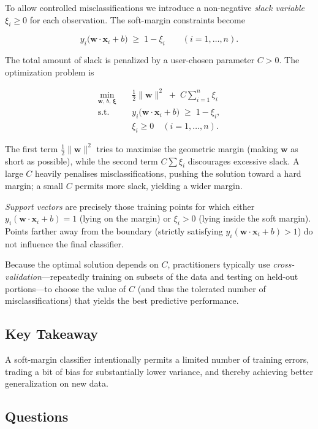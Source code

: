 \documentclass[12pt, a4paper]{article}
\begin{document}
To allow controlled misclassifications we introduce a non-negative \emph{slack variable} \(\xi_i\ge 0\) for each observation.  The soft-margin constraints become  

\[
y_i\bigl(\mathbf{w}\!\cdot\!\mathbf{x}_i + b\bigr) \;\ge\; 1 - \xi_i \qquad (i=1,\dots,n).
\]

The total amount of slack is penalized by a user-chosen parameter \(C>0\).  The optimization problem is  

\[
\begin{aligned}
\min_{\mathbf{w},\,b,\,\boldsymbol{\xi}} \quad & \frac{1}{2}\|\mathbf{w}\|^{2} \;+\; C\sum_{i=1}^{n}\xi_i \\[4pt]
\text{s.t.}\quad & y_i\bigl(\mathbf{w}\!\cdot\!\mathbf{x}_i + b\bigr) \;\ge\; 1 - \xi_i,\\
                 & \xi_i \ge 0 \quad (i=1,\dots,n).
\end{aligned}
\]

The first term \(\tfrac{1}{2}\|\mathbf{w}\|^{2}\) tries to maximise the geometric margin (making \(\mathbf{w}\) as short as possible), while the second term \(C\sum\xi_i\) discourages excessive slack.  A large \(C\) heavily penalises misclassifications, pushing the solution toward a hard margin; a small \(C\) permits more slack, yielding a wider margin.  

\emph{Support vectors} are precisely those training points for which either \(y_i(\mathbf{w}\!\cdot\!\mathbf{x}_i + b)=1\) (lying on the margin) or \(\xi_i>0\) (lying inside the soft margin).  Points farther away from the boundary (strictly satisfying \(y_i(\mathbf{w}\!\cdot\!\mathbf{x}_i + b) > 1\)) do not influence the final classifier.

Because the optimal solution depends on \(C\), practitioners typically use \emph{cross-validation}---repeatedly training on subsets of the data and testing on held-out portions---to choose the value of \(C\) (and thus the tolerated number of misclassifications) that yields the best predictive performance.

\subsection{Key Takeaway}
A soft-margin classifier intentionally permits a limited number of training errors, trading a bit of bias for substantially lower variance, and thereby achieving better generalization on new data.

\newpage
\subsection*{Questions}
\end{document}
